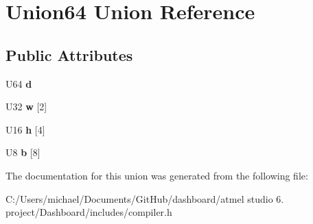 \hypertarget{union_union64}{\section{Union64 Union Reference}
\label{union_union64}
}
\subsection*{Public Attributes}
\begin{DoxyCompactItemize}
\item 
\hypertarget{union_union64_aa098af02413979c81d51f97e8f90a291}{U64 {\bfseries d}}\label{union_union64_aa098af02413979c81d51f97e8f90a291}

\item 
\hypertarget{union_union64_a839230bb7f70045a4af080d3ea5217ed}{U32 {\bfseries w} \mbox{[}2\mbox{]}}\label{union_union64_a839230bb7f70045a4af080d3ea5217ed}

\item 
\hypertarget{union_union64_a80944393427114791d75749b1ace4eff}{U16 {\bfseries h} \mbox{[}4\mbox{]}}\label{union_union64_a80944393427114791d75749b1ace4eff}

\item 
\hypertarget{union_union64_a1267071d53d0781b19094917f3f94975}{U8 {\bfseries b} \mbox{[}8\mbox{]}}\label{union_union64_a1267071d53d0781b19094917f3f94975}

\end{DoxyCompactItemize}


The documentation for this union was generated from the following file\-:\begin{DoxyCompactItemize}
\item 
C\-:/\-Users/michael/\-Documents/\-Git\-Hub/dashboard/atmel studio 6. project/\-Dashboard/includes/compiler.\-h\end{DoxyCompactItemize}
